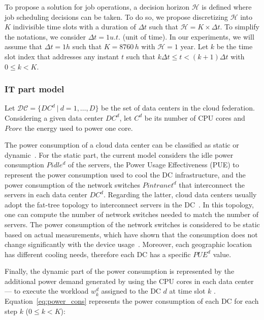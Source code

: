 To propose a solution for job operations, a decision horizon $\mathcal{H}$ is defined where job scheduling decisions can be taken. To do so, we propose discretizing $\mathcal{H}$ into $K$ indivisible time slots with a duration of $\Delta t$ such that $\mathcal{H} = K\times\Delta t$. To simplify the notations, we consider $\Delta t = 1 u.t.$ (unit of time). In our experiments, we will assume that $\Delta t = 1h$ such that $K = 8760\,h$ with $\mathcal{H} = 1$ year. 
Let $k$ be the time slot index that addresses any instant $t$ such that $k\Delta t\leq t < (k+1)\Delta t$ with $0\leq k< K$. 


\subsubsection{IT part model} 

Let $\mathcal{DC} = \{DC^d \ | \ d=1, \ldots, D\}$ be the set of data centers in the cloud federation. Considering a given data center $DC^d$, let $C^d$ be its number of CPU cores and $Pcore$ the energy used to power one core.


The power consumption of a cloud data center can be classified as static or dynamic~\cite{ahvar22_estimating_cloud_cons}. For the static part, the current model considers the idle power consumption $Pidle^d$ of the servers, the Power Usage Effectiveness (PUE) to represent the power consumption used to cool the DC infrastructure, and the power consumption of the network switches $Pintranet^d$ that interconnect the servers in each data center $DC^d$. Regarding the latter, cloud data centers usually adopt the fat-tree topology to interconnect servers in the DC~\cite{ahvar22_estimating_cloud_cons}. In this topology, one can compute the number of network switches needed to match the number of servers. The power consumption of the network switches is considered to be static based on actual measurements, which have shown that the consumption does not change significantly with the device usage~\cite{Hlavacs2009_energy_network_devices}. Moreover, each geographic location has different cooling needs, therefore each DC has a specific $PUE^d$ value. 

Finally, the dynamic part of the power consumption is represented by the additional power demand generated by using the CPU cores in each data center --- to execute the workload $ w^d_k$ assigned to the DC $d$ at time slot $k$ . Equation~\eqref{eq:power_cons} represents the power consumption of each DC for each step $k$ ($0\leq k<K$):

